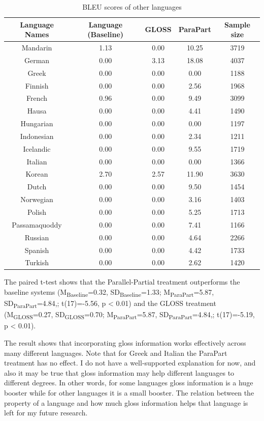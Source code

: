 \documentclass[final]{ua-thesis}
\numberwithin{equation}{section}
\begin{document}
\begin{table}[ht]
\centering
\begin{tabular}{ccccc}
  \hline
Language Names & Language (Baseline) & GLOSS & ParaPart & Sample size \\ 
  \hline
Mandarin & 1.13 & 0.00 & 10.25 & 3719 \\ 
  German & 0.00 & 3.13 & 18.08 & 4037 \\ 
  Greek & 0.00 & 0.00 & 0.00 & 1188 \\ 
  Finnish & 0.00 & 0.00 & 2.56 & 1968 \\ 
  French & 0.96 & 0.00 & 9.49 & 3099 \\ 
  Hausa & 0.00 & 0.00 & 4.41 & 1490 \\ 
  Hungarian & 0.00 & 0.00 & 0.00 & 1197 \\ 
  Indonesian & 0.00 & 0.00 & 2.34 & 1211 \\ 
  Icelandic & 0.00 & 0.00 & 9.55 & 1719 \\ 
  Italian & 0.00 & 0.00 & 0.00 & 1366 \\ 
  Korean & 2.70 & 2.57 & 11.90 & 3630 \\ 
  Dutch & 0.00 & 0.00 & 9.50 & 1454 \\ 
  Norwegian & 0.00 & 0.00 & 3.16 & 1403 \\ 
  Polish & 0.00 & 0.00 & 5.25 & 1713 \\ 
  Passamaquoddy & 0.00 & 0.00 & 7.41 & 1166 \\ 
  Russian & 0.00 & 0.00 & 4.64 & 2266 \\ 
  Spanish & 0.00 & 0.00 & 4.42 & 1733 \\ 
  Turkish & 0.00 & 0.00 & 2.62 & 1420 \\ 
   \hline
\end{tabular}
\caption{BLEU scores of other languages} 
\label{Table:Other_LG_BLEU}
\end{table}
\newpage
The paired t-test shows that the Parallel-Partial treatment outperforms the baseline systems 
(M\textsubscript{Baseline}=0.32, SD\textsubscript{Baseline}=1.33; M\textsubscript{ParaPart}=5.87, SD\textsubscript{ParaPart}=4.84,; t(17)=-5.56, p < 0.01) and the GLOSS treatment 
(M\textsubscript{GLOSS}=0.27, SD\textsubscript{GLOSS}=0.70; M\textsubscript{ParaPart}=5.87, SD\textsubscript{ParaPart}=4.84,; t(17)=-5.19, p < 0.01).


The result shows that incorporating gloss information works effectively across many different languages. Note that for Greek and Italian the ParaPart treatment has no effect. I do not have a well-supported explanation for now, and also it may be true that gloss information may help different languages to different degrees. In other words, for some languages gloss information is a huge booster while for other languages it is a small booster. The relation between the property of a language and how much gloss information helps that language is left for my future research.     
\end{document}
